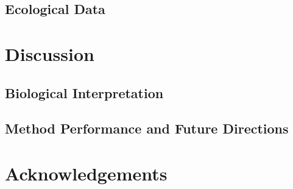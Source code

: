 \documentclass[11pt]{amsart}
\begin{document}
\subsection{Ecological Data}
\clearpage
\section{Discussion}
\subsection{Biological Interpretation}
\subsection{Method Performance and Future Directions}
\clearpage
\section{Acknowledgements}
\clearpage

\end{document}
